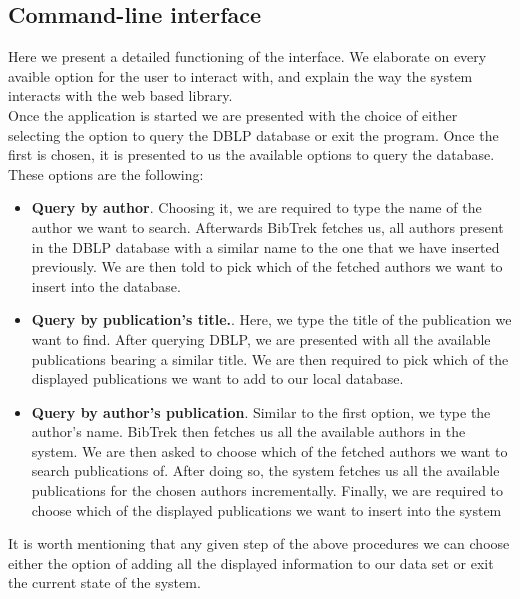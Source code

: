\documentclass[twocolumn]{article}
\begin{document}
\subsection{Command-line interface}
Here we present a detailed functioning of the interface. We elaborate on every avaible option for the user to interact with, and explain the way the system interacts with the web based library.
\\[1\baselineskip]
Once the application is started we are presented with the choice of either selecting the option to query the DBLP database or exit the program. Once the first is chosen, it is presented to us the available options to query the database. These options are the following:

\begin{itemize}
\item \textbf{Query by author}. Choosing it, we are required to type the name of the author we want to search. Afterwards BibTrek fetches us, all authors present in the DBLP database with a similar name to the one that we have inserted previously. We are then told to pick which of the fetched authors we want to insert into the database.
\item \textbf{Query by publication's title.}. Here, we type the title of the publication we want to find. After querying DBLP, we are presented with all the available publications bearing a similar title. We are then required to pick which of the displayed publications we want to add to our local database.
\item \textbf{Query by author's publication}. Similar to the first option, we type the author's name. BibTrek then fetches us all the available authors in the system. We are then asked to choose which of the fetched authors we want to search publications of. After doing so, the system fetches us all the available publications for the chosen authors incrementally. Finally, we are required to choose which of the displayed publications we want to insert into the system
\end{itemize}
It is worth mentioning that any given step of the above procedures we can choose either the option of adding all the displayed information to our data set or exit the current state of the system.
\end{document}

